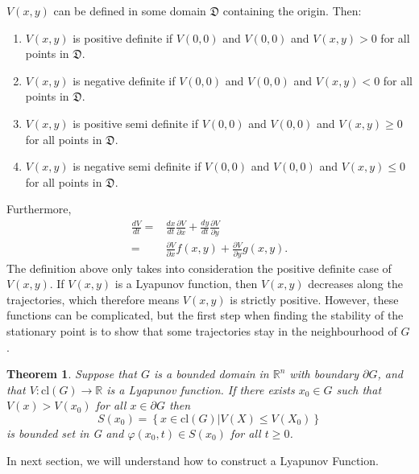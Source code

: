 \documentclass[a4paper]{report}
\newtheorem{thm}{Theorem}
\theoremstyle{definition}
\begin{document}
$V(x,y)$ can be defined in some domain $\mathfrak{D}$ containing the origin. Then:
\begin{enumerate}
\item $V(x,y)$ is positive definite if $V(0,0)$ and $V(0,0)$ and $V(x,y)>0$ for all points in $\mathfrak{D}$. 
\item $V(x,y)$ is negative definite if $V(0,0)$ and $V(0,0)$ and $V(x,y)<0$ for all points in $\mathfrak{D}$.
\item $V(x,y)$ is positive semi definite if $V(0,0)$ and $V(0,0)$ and $V(x,y)\geq{0}$ for all points in $\mathfrak{D}$.
\item $V(x,y)$ is negative semi definite if $V(0,0)$ and $V(0,0)$ and $V(x,y)\leq{0}$ for all points in $\mathfrak{D}$.
\end{enumerate} 
Furthermore,
\begin{align}
\frac{dV}{dt}=&\frac{dx}{dt}\frac{\partial V}{\partial x}+\frac{dy}{dt}\frac{\partial V}{\partial y} \\
=& \frac{\partial V}{\partial x} f(x,y)+ \frac{\partial V}{\partial y} g(x,y).
\end{align}
\newline 
The definition above only takes into consideration the positive definite case of $V(x,y)$. If $V(x,y)$ is a Lyapunov function, then $V(x,y)$ decreases along the trajectories, which therefore means $V(x,y)$ is strictly positive. However, these functions can be complicated, but the first step when finding the stability of the stationary point is to show that some trajectories stay in the neighbourhood of $G$. 
\newline
\begin{mdframed}[backgroundcolor=airforceblue!25] 
\begin{thm} \label{thm:1}
Suppose that $G$ is a bounded domain in ${\mathbb{R}^{n}}$ with boundary $\partial G$, and that $V:\text{cl}(G) \longrightarrow \mathbb{R}$ is a Lyapunov function. If there exists $x_0 \in G$ such that $V(x)>V(x_0)$ for all $x\in \partial G$ then
$$S(x_0) = \left\{x \in \text{cl}(G)|V(X) \leq V(X_0)\right\}$$ is bounded set in G and $\varphi(x_0,t) \in S(x_0)$ for all $t\geq 0$.
\end{thm}
\end{mdframed}
In next section, we will understand how to construct a Lyapunov Function.
\end{document}

